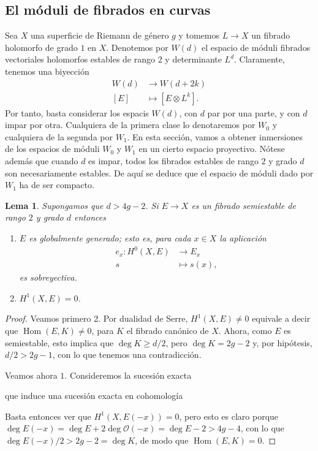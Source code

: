 \documentclass[12pt, a4paper]{amsart}
\newcommand\OO{\mathscr{O}}
\DeclareMathOperator\Hom{Hom}
\newtheorem{lema}[thm]{Lema}
\theoremstyle{remark} \newtheorem{rmk}[thm]{Observación}
\theoremstyle{remark} \newtheorem{rmks}[thm]{Observaciones}
\theoremstyle{definition} \newtheorem{defn}[thm]{Definición}
\theoremstyle{definition} \newtheorem{ejs}[thm]{Ejemplos}
\theoremstyle{definition} \newtheorem{ej}[thm]{Ejemplo}
\begin{document}
\subsection{El móduli de fibrados en curvas}
Sea $X$ una superficie de Riemann de género $g$ y tomemos $L\rightarrow X$ un fibrado holomorfo de grado $1$ en $X$. Denotemos por $W(d)$ el espacio de móduli fibrados vectoriales holomorfos estables de rango $2$ y determinante $L^d$. Claramente, tenemos una biyección 
\begin{align*}
	W(d) & \longrightarrow W(d+2k) \\
[E] & \longmapsto [E\otimes L^k].
\end{align*} 
Por tanto, basta considerar los espacis $W(d)$, con $d$ par por una parte, y con $d$ impar por otra. Cualquiera de la primera clase lo denotaremos por $W_0$ y cualquiera de la segunda por $W_1$. En esta sección, vamos a obtener inmersiones de los espacios de móduli $W_0$ y $W_1$ en un cierto espacio proyectivo. Nótese además que cuando $d$ es impar, todos los fibrados estables de rango $2$ y grado $d$ son necesariamente estables. De aquí se deduce que el espacio de móduli dado por $W_1$ ha de ser compacto. 

\begin{lema}
	Supongamos que $d>4g-2$. Si $E\rightarrow X$ es un fibrado semiestable de rango $2$ y grado $d$ entonces
	\begin{enumerate}
		\item $E$ es globalmente generado; esto es, para cada $x\in X$ la aplicación
			\begin{align*}
				e_x:H^0(X,E) & \longrightarrow E_x \\
				s & \longmapsto s(x),
			\end{align*} 
			es sobreyectiva.
		\item $H^1(X,E)=0$.
	\end{enumerate}
\end{lema}
\begin{proof}
	Veamos primero 2. Por dualidad de Serre, $H^1(X,E)\neq 0$ equivale a decir que $\Hom(E,K)\neq 0$, para $K$ el fibrado canónico de $X$. Ahora, como $E$ es semiestable, esto implica que $\deg K\geq d/2$, pero $\deg K=2g-2$ y, por hipótesis, $d/2>2g-1$, con lo que tenemos una contradicción.

	Veamos ahora $1$. Consideremos la sucesión exacta
	\begin{center}
	\end{center}
	que induce una sucesión exacta en cohomología
	\begin{center}
	\end{center}
	Basta entonces ver que $H^1(X,E(-x))=0$, pero esto es claro porque $\deg E(-x) =\deg E + 2\deg \OO(-x)=\deg E -2 > 4g-4$, con lo que $\deg E(-x)/2 > 2g-2=\deg K$, de modo que $\Hom(E,K)=0$.
\end{proof}
\end{document}
